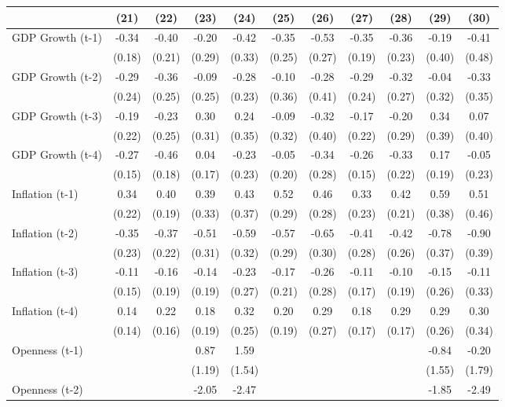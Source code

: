 \begin{tabular}{lcccccccccc}
\toprule
& (21) & (22) & (23) & (24) & (25) & (26) & (27) & (28) & (29) & (30) \\ 
\midrule
GDP Growth (t-1) & -0.34 & -0.40 & -0.20 & -0.42 & -0.35 & -0.53 & -0.35 & -0.36 & -0.19 & -0.41 \\
& (0.18) & (0.21) & (0.29) & (0.33) & (0.25) & (0.27) & (0.19) & (0.23) & (0.40) & (0.48) \\
GDP Growth (t-2) & -0.29 & -0.36 & -0.09 & -0.28 & -0.10 & -0.28 & -0.29 & -0.32 & -0.04 & -0.33 \\
& (0.24) & (0.25) & (0.25) & (0.23) & (0.36) & (0.41) & (0.24) & (0.27) & (0.32) & (0.35) \\
GDP Growth (t-3) & -0.19 & -0.23 & 0.30 & 0.24 & -0.09 & -0.32 & -0.17 & -0.20 & 0.34 & 0.07 \\
& (0.22) & (0.25) & (0.31) & (0.35) & (0.32) & (0.40) & (0.22) & (0.29) & (0.39) & (0.40) \\
GDP Growth (t-4) & -0.27 & -0.46 & 0.04 & -0.23 & -0.05 & -0.34 & -0.26 & -0.33 & 0.17 & -0.05 \\
& (0.15) & (0.18) & (0.17) & (0.23) & (0.20) & (0.28) & (0.15) & (0.22) & (0.19) & (0.23) \\
Inflation (t-1) & 0.34 & 0.40 & 0.39 & 0.43 & 0.52 & 0.46 & 0.33 & 0.42 & 0.59 & 0.51 \\
& (0.22) & (0.19) & (0.33) & (0.37) & (0.29) & (0.28) & (0.23) & (0.21) & (0.38) & (0.46) \\
Inflation (t-2) & -0.35 & -0.37 & -0.51 & -0.59 & -0.57 & -0.65 & -0.41 & -0.42 & -0.78 & -0.90 \\
& (0.23) & (0.22) & (0.31) & (0.32) & (0.29) & (0.30) & (0.28) & (0.26) & (0.37) & (0.39) \\
Inflation (t-3) & -0.11 & -0.16 & -0.14 & -0.23 & -0.17 & -0.26 & -0.11 & -0.10 & -0.15 & -0.11 \\
& (0.15) & (0.19) & (0.19) & (0.27) & (0.21) & (0.28) & (0.17) & (0.19) & (0.26) & (0.33) \\
Inflation (t-4) & 0.14 & 0.22 & 0.18 & 0.32 & 0.20 & 0.29 & 0.18 & 0.29 & 0.29 & 0.30 \\
& (0.14) & (0.16) & (0.19) & (0.25) & (0.19) & (0.27) & (0.17) & (0.17) & (0.26) & (0.34) \\
Openness (t-1) &  &  & 0.87 & 1.59 &  &  &  &  & -0.84 & -0.20 \\
&  &  & (1.19) & (1.54) &  &  &  &  & (1.55) & (1.79) \\
Openness (t-2) &  &  & -2.05 & -2.47 &  &  &  &  & -1.85 & -2.49 \\

\end{tabular}
